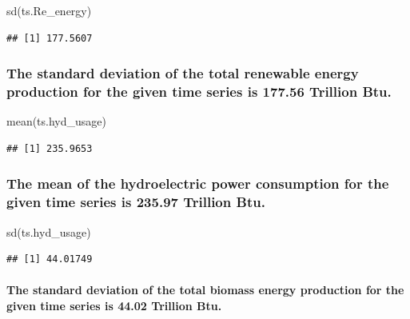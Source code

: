 \documentclass[
]{article}
\newenvironment{Shaded}{\begin{snugshade}}{\end{snugshade}}
\newcommand{\FunctionTok}[1]{\textcolor[rgb]{0.00,0.00,0.00}{#1}}
\newcommand{\NormalTok}[1]{#1}
\begin{document}
\begin{Shaded}
\begin{Highlighting}[]
\FunctionTok{sd}\NormalTok{(ts.Re\_energy)}
\end{Highlighting}
\end{Shaded}

\begin{verbatim}
## [1] 177.5607
\end{verbatim}

\hypertarget{the-standard-deviation-of-the-total-renewable-energy-production-for-the-given-time-series-is-177.56-trillion-btu.}{%
\subsubsection{The standard deviation of the total renewable energy
production for the given time series is 177.56 Trillion
Btu.}\label{the-standard-deviation-of-the-total-renewable-energy-production-for-the-given-time-series-is-177.56-trillion-btu.}}

\begin{Shaded}
\begin{Highlighting}[]
\FunctionTok{mean}\NormalTok{(ts.hyd\_usage) }
\end{Highlighting}
\end{Shaded}

\begin{verbatim}
## [1] 235.9653
\end{verbatim}

\hypertarget{the-mean-of-the-hydroelectric-power-consumption-for-the-given-time-series-is-235.97-trillion-btu.}{%
\subsubsection{The mean of the hydroelectric power consumption for the
given time series is 235.97 Trillion
Btu.}\label{the-mean-of-the-hydroelectric-power-consumption-for-the-given-time-series-is-235.97-trillion-btu.}}

\begin{Shaded}
\begin{Highlighting}[]
\FunctionTok{sd}\NormalTok{(ts.hyd\_usage) }
\end{Highlighting}
\end{Shaded}

\begin{verbatim}
## [1] 44.01749
\end{verbatim}

\hypertarget{the-standard-deviation-of-the-total-biomass-energy-production-for-the-given-time-series-is-44.02-trillion-btu.}{%
\paragraph{The standard deviation of the total biomass energy production
for the given time series is 44.02 Trillion
Btu.}\label{the-standard-deviation-of-the-total-biomass-energy-production-for-the-given-time-series-is-44.02-trillion-btu.}}
\end{document}
